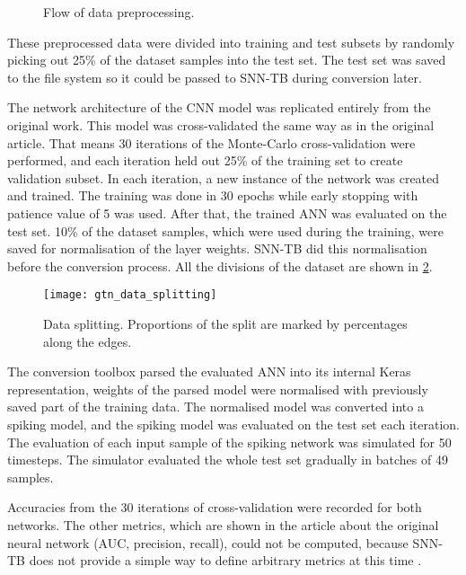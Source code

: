 \begin{figure}[htb]
    \centering
    
    \caption{Flow of data preprocessing.}
    \label{fig:gtn_preprocessing}
\end{figure}

These preprocessed data were divided into training and test subsets by randomly picking out 25\% of the dataset samples into the test set. The test set was saved to the file system so it could be passed to SNN-TB during conversion later. \par
The network architecture of the CNN model was replicated entirely from the original work. This model was cross-validated the same way as in the original article. That means 30 iterations of the Monte-Carlo cross-validation were performed, and each iteration held out 25\% of the training set to create validation subset. In each iteration, a new instance of the network was created and trained. The training was done in 30 epochs while early stopping with patience value of 5 was used. After that, the trained ANN was evaluated on the test set. 10\% of the dataset samples, which were used during the training, were saved for normalisation of the layer weights. SNN-TB did this normalisation before the conversion process. All the divisions of the dataset are shown in \cref{fig:gtn_data_spliting}.

\begin{figure}[htb]
    \centering
    \texttt{[image: gtn\_data\_splitting]}
    \caption{Data splitting. Proportions of the split are marked by percentages along the edges.}
    \label{fig:gtn_data_spliting}
\end{figure}

The conversion toolbox parsed the evaluated ANN into its internal Keras representation, weights of the parsed model were normalised with previously saved part of the training data. The normalised model was converted into a spiking model, and the spiking model was evaluated on the test set each iteration. The evaluation of each input sample of the spiking network was simulated for 50 timesteps. The simulator evaluated the whole test set gradually in batches of 49 samples. \par
Accuracies from the 30 iterations of cross-validation were recorded for both networks. The other metrics, which are shown in the article about the original neural network (AUC, precision, recall), could not be computed, because SNN-TB does not provide a simple way to define arbitrary metrics at this time \footnotemark.

